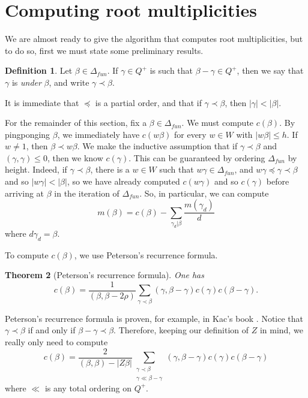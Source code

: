 \documentclass[12pt]{report}
\newcommand{\dfn}[1]{\emph{#1}\index{#1}}
\newtheorem{theorem}{Theorem}[chapter]
\theoremstyle{definition}
\newtheorem{definition}[theorem]{Definition}
\begin{document}
\section{Computing root multiplicities}
	We are almost ready to give the algorithm that computes root multiplicities, but to do so, first we must state some preliminary results.
\begin{definition}
	Let $\beta \in \Delta_{fun}$. If $\gamma \in Q^+$ is such that $\beta - \gamma \in Q^+$, then we say that $\gamma$ is \dfn{under} $\beta$, and write $\gamma \prec \beta$.
\end{definition}
	It is immediate that $\preceq$ is a partial order, and that if $\gamma \prec \beta$, then $|\gamma| < |\beta|$.

	For the remainder of this section, fix a $\beta \in \Delta_{fun}$. We must compute $c(\beta)$. By pingponging $\beta$, we immediately have $c(w\beta)$ for every $w \in W$ with $|w\beta| \leq h$. If $w \neq 1$, then $\beta \prec w\beta$. We make the inductive assumption that if $\gamma \prec \beta$ and $(\gamma, \gamma) \leq 0$, then we know $c(\gamma)$. This can be guaranteed by ordering $\Delta_{fun}$ by height. Indeed, if $\gamma \prec \beta$, there is a $w \in W$ such that $w\gamma \in \Delta_{fun}$, and $w\gamma \preceq \gamma \prec \beta$ and so $|w\gamma| < |\beta|$, so we have already computed $c(w\gamma)$ and so $c(\gamma)$ before arriving at $\beta$ in the iteration of $\Delta_{fun}$. So, in particular, we can compute
	$$m(\beta) = c(\beta) - \sum_{\gamma_d|\beta} \frac{m(\gamma_d)}{d}$$
	where $d\gamma_d = \beta$.

To compute $c(\beta)$, we use Peterson's recurrence formula.
\begin{theorem}[Peterson's recurrence formula]
	One has
	$$c(\beta) = \frac{1}{( \beta, \beta - 2\rho)}\sum_{\gamma \prec \beta} ( \gamma, \beta - \gamma ) c(\gamma) c(\beta - \gamma).$$
\end{theorem}
Peterson's recurrence formula is proven, for example, in Kac's book \cite{kac_2014}. Notice that $\gamma \prec \beta$ if and only if $\beta - \gamma \prec \beta$. Therefore, keeping our definition of $Z$ in mind, we really only need to compute
$$c(\beta) = \frac{2}{( \beta, \beta) - |Z\beta|}\sum_{\substack{\gamma \prec \beta\\\gamma \ll \beta - \gamma}} ( \gamma, \beta - \gamma ) c(\gamma) c(\beta - \gamma)$$
where $\ll$ is any total ordering on $Q^+$.
\end{document}
